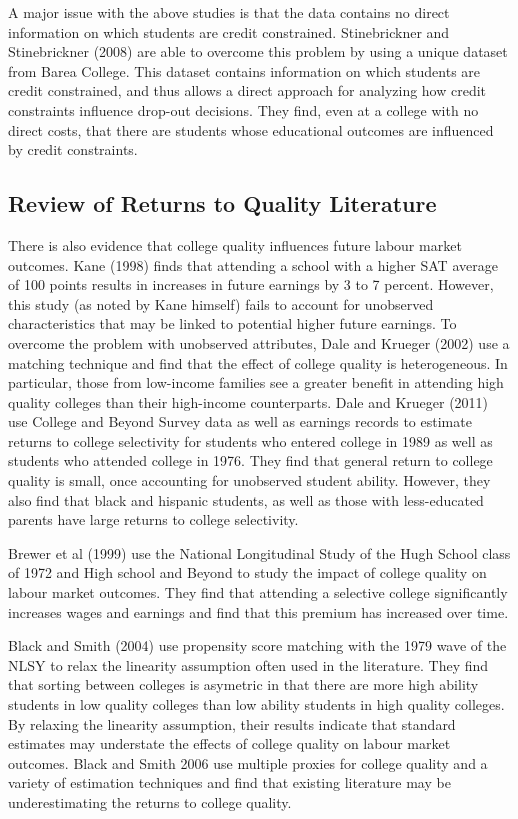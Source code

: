 \documentclass[letterpaper,12pt]{article}
\begin{document}
A major issue with the above studies is that the data contains no direct information on which students are credit constrained. Stinebrickner and Stinebrickner (2008) are able to overcome this problem by using a unique dataset from Barea College. This dataset contains information on which students are credit constrained, and thus allows a direct approach for analyzing how credit constraints influence drop-out decisions. They find, even at a college with no direct costs, that there are students whose educational outcomes are influenced by credit constraints. 


\subsection{Review of Returns to Quality Literature}

There is also evidence that college quality influences future labour market outcomes. Kane (1998) finds that attending a school with a higher SAT average of 100 points results in increases in future earnings by 3 to 7 percent. However, this study (as noted by Kane himself) fails to account for unobserved characteristics that may be linked to potential higher future earnings. To overcome the problem with unobserved attributes, Dale and Krueger (2002) use a matching technique and find that the effect of college quality is heterogeneous. In particular, those from low-income families see a greater benefit in attending high quality colleges than their high-income counterparts. Dale and Krueger (2011) use College and Beyond Survey data as well as earnings records to estimate returns to college selectivity for students who entered college in 1989 as well as students who attended college in 1976. They find that general return to college quality is small, once accounting for unobserved student ability. However, they also find that black and hispanic students, as well as those with less-educated parents have large returns to college selectivity. 

Brewer et al (1999) use the National Longitudinal Study of the Hugh School class of 1972 and High school and Beyond to study the impact of college quality on labour market outcomes. They find that attending a selective college significantly increases wages and earnings and find that this premium has increased over time. 

Black and Smith (2004) use propensity score matching with the 1979 wave of the NLSY to relax the linearity assumption often used in the literature. They find that sorting between colleges is asymetric in that there are more high ability students in low quality colleges than low ability students in high quality colleges. By relaxing the linearity assumption, their results indicate that standard estimates may understate the effects of college quality on labour market outcomes. Black and Smith 2006 use multiple proxies for college quality and a variety of estimation techniques and find that existing literature may be underestimating the returns to college quality. 
\end{document}

